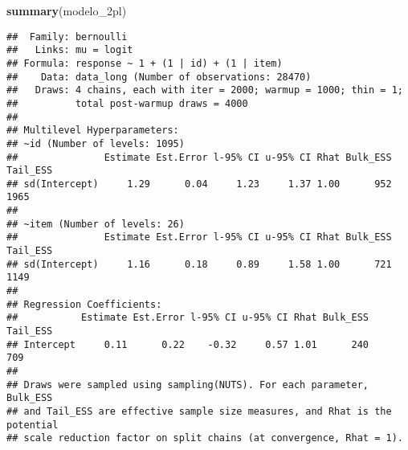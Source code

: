\documentclass[
]{article}
\newenvironment{Shaded}{\begin{snugshade}}{\end{snugshade}}
\newcommand{\CommentTok}[1]{\textcolor[rgb]{0.56,0.35,0.01}{\textit{#1}}}
\newcommand{\FunctionTok}[1]{\textcolor[rgb]{0.13,0.29,0.53}{\textbf{#1}}}
\newcommand{\NormalTok}[1]{#1}
\newcommand{\SpecialCharTok}[1]{\textcolor[rgb]{0.81,0.36,0.00}{\textbf{#1}}}
\begin{document}
\begin{Shaded}
\begin{Highlighting}[]
\FunctionTok{summary}\NormalTok{(modelo\_2pl)}
\end{Highlighting}
\end{Shaded}

\begin{verbatim}
##  Family: bernoulli 
##   Links: mu = logit 
## Formula: response ~ 1 + (1 | id) + (1 | item) 
##    Data: data_long (Number of observations: 28470) 
##   Draws: 4 chains, each with iter = 2000; warmup = 1000; thin = 1;
##          total post-warmup draws = 4000
## 
## Multilevel Hyperparameters:
## ~id (Number of levels: 1095) 
##               Estimate Est.Error l-95% CI u-95% CI Rhat Bulk_ESS Tail_ESS
## sd(Intercept)     1.29      0.04     1.23     1.37 1.00      952     1965
## 
## ~item (Number of levels: 26) 
##               Estimate Est.Error l-95% CI u-95% CI Rhat Bulk_ESS Tail_ESS
## sd(Intercept)     1.16      0.18     0.89     1.58 1.00      721     1149
## 
## Regression Coefficients:
##           Estimate Est.Error l-95% CI u-95% CI Rhat Bulk_ESS Tail_ESS
## Intercept     0.11      0.22    -0.32     0.57 1.01      240      709
## 
## Draws were sampled using sampling(NUTS). For each parameter, Bulk_ESS
## and Tail_ESS are effective sample size measures, and Rhat is the potential
## scale reduction factor on split chains (at convergence, Rhat = 1).
\end{verbatim}

\begin{Shaded}
\end{Shaded}
\end{document}
